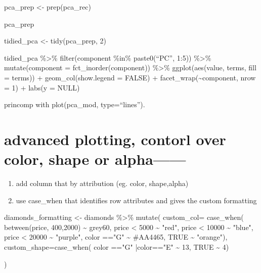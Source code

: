 \documentclass[
  letterpaper,
  DIV=11,
  numbers=noendperiod]{scrreprt}
\newenvironment{Shaded}{\begin{snugshade}}{\end{snugshade}}
\newcommand{\AttributeTok}[1]{\textcolor[rgb]{0.40,0.45,0.13}{#1}}
\newcommand{\ConstantTok}[1]{\textcolor[rgb]{0.56,0.35,0.01}{#1}}
\newcommand{\DecValTok}[1]{\textcolor[rgb]{0.68,0.00,0.00}{#1}}
\newcommand{\FunctionTok}[1]{\textcolor[rgb]{0.28,0.35,0.67}{#1}}
\newcommand{\NormalTok}[1]{\textcolor[rgb]{0.00,0.23,0.31}{#1}}
\newcommand{\OtherTok}[1]{\textcolor[rgb]{0.00,0.23,0.31}{#1}}
\newcommand{\SpecialCharTok}[1]{\textcolor[rgb]{0.37,0.37,0.37}{#1}}
\newcommand{\StringTok}[1]{\textcolor[rgb]{0.13,0.47,0.30}{#1}}
\providecommand{\tightlist}{%
  \setlength{\itemsep}{0pt}\setlength{\parskip}{0pt}}\usepackage{longtable,booktabs,array}
\begin{document}
pca\_prep \textless- prep(pca\_rec)

pca\_prep

tidied\_pca \textless- tidy(pca\_prep, 2)

tidied\_pca \%\textgreater\% filter(component \%in\% paste0(``PC'',
1:5)) \%\textgreater\% mutate(component = fct\_inorder(component))
\%\textgreater\% ggplot(aes(value, terms, fill = terms)) +
geom\_col(show.legend = FALSE) + facet\_wrap(\textasciitilde component,
nrow = 1) + labs(y = NULL)

princomp with plot(pca\_mod, type=``lines'').

\section{advanced plotting, contorl over color, shape or
alpha------}\label{advanced-plotting-contorl-over-color-shape-or-alpha}

\begin{enumerate}
\def\labelenumi{\arabic{enumi})}
\tightlist
\item
  add column that by attribution (eg. color, shape,alpha)
\item
  use case\_when that identifies row attributes and gives the custom
  formatting
\end{enumerate}

\begin{Shaded}
\begin{Highlighting}[]
\NormalTok{diamonds\_formatting }\OtherTok{\textless{}{-}}\NormalTok{ diamonds }\SpecialCharTok{\%\textgreater{}\%} 
  \FunctionTok{mutate}\NormalTok{(}
\AttributeTok{custom\_col=} \FunctionTok{case\_when}\NormalTok{(}
  \FunctionTok{between}\NormalTok{(price, }\DecValTok{400}\NormalTok{,}\DecValTok{2000}\NormalTok{) }\SpecialCharTok{\textasciitilde{}} \StringTok{\textquotesingle{}grey60\textquotesingle{}}\NormalTok{,}
\NormalTok{  price }\SpecialCharTok{\textless{}} \DecValTok{5000} \SpecialCharTok{\textasciitilde{}} \StringTok{"red"}\NormalTok{,}
\NormalTok{  price }\SpecialCharTok{\textless{}} \DecValTok{10000} \SpecialCharTok{\textasciitilde{}} \StringTok{"blue"}\NormalTok{,}
\NormalTok{  price }\SpecialCharTok{\textless{}} \DecValTok{20000} \SpecialCharTok{\textasciitilde{}} \StringTok{"purple"}\NormalTok{,}
\NormalTok{  color }\SpecialCharTok{==}\StringTok{"G"} \SpecialCharTok{\textasciitilde{}} \StringTok{\textquotesingle{}\#AA4465\textquotesingle{}}\NormalTok{,}
  \ConstantTok{TRUE} \SpecialCharTok{\textasciitilde{}} \StringTok{"orange"}\NormalTok{),}
\AttributeTok{custom\_shape=}\FunctionTok{case\_when}\NormalTok{(}
\NormalTok{  color }\SpecialCharTok{==}\StringTok{"G"} \SpecialCharTok{|}\NormalTok{color}\SpecialCharTok{==}\StringTok{"E"} \SpecialCharTok{\textasciitilde{}} \DecValTok{13}\NormalTok{,}
  \ConstantTok{TRUE} \SpecialCharTok{\textasciitilde{}} \DecValTok{4}\NormalTok{)}
  
\NormalTok{)}
\end{Highlighting}
\end{Shaded}
\end{document}
